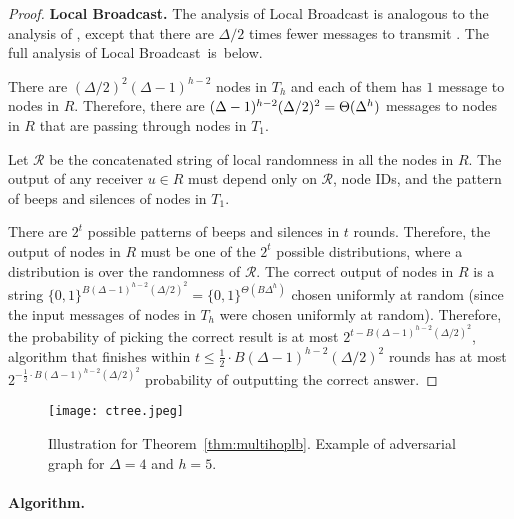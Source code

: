 \begin{proof}
    \noindent\textbf{Local Broadcast.} The analysis of Local Broadcast is analogous to the analysis of , except that there are $\Delta/2$ times fewer messages to transmit . The full analysis of Local Broadcast~is~below.

    There are $(\Delta/2)^2(\Delta-1)^{h-2}$ nodes in $T_h$ and each of them has $1$ message to nodes in $R$. Therefore, there are $(\Delta-1)^{h-2}(\Delta/2)^2 = \Theta(\Delta^{h})$ messages to nodes in $R$ that are passing through nodes in $T_1$.

    Let $\mathcal{R}$ be the concatenated string of local randomness in all the nodes in $R$. The output of any receiver $u \in R$ must depend only on $\mathcal{R}$, node IDs, and the pattern of beeps and silences of nodes in $T_1$.

    There are $2^t$ possible patterns of beeps and silences in $t$ rounds. Therefore, the output of nodes in $R$ must be one of the $2^t$ possible distributions, where a distribution is over the randomness of $\mathcal{R}$. The correct output of nodes in $R$ is a string $\{0,1\}^{B(\Delta-1)^{h-2}(\Delta/2)^2}=\{0,1\}^{\Theta(B\Delta^{h})}$ chosen uniformly at random (since the input messages of nodes in $T_{h}$ were chosen uniformly at random). Therefore, the probability of picking the correct result is at most $2^{t-B(\Delta-1)^{h-2}(\Delta/2)^2}$,
     algorithm that finishes within $t \leq \frac{1}{2}\cdot B(\Delta-1)^{h-2}(\Delta/2)^2$ rounds has at most $2^{-\frac{1}{2}\cdot B(\Delta-1)^{h-2}(\Delta/2)^2}$ probability of outputting the correct answer.
\end{proof}

    \begin{figure}[t]
        \centering
        \texttt{[image: ctree.jpeg]}
        \caption{Illustration for Theorem~\ref{thm:multihoplb}. Example of adversarial graph for $\Delta=4$ and $h=5$.}
        \label{fig:multihop_graph2}
    \end{figure}
    
\vspace*{-1.5ex}
\paragraph{Algorithm.}
%


